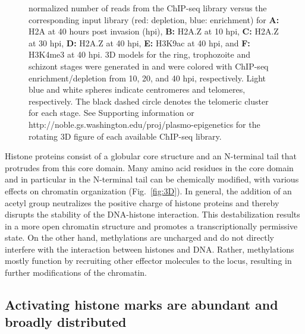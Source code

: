 \begin{figure}
{normalized number of reads from the ChIP-seq library versus the corresponding
input library (red: depletion, blue: enrichment) for \textbf{A:} H2A at
40 hours post invasion (hpi), \textbf{B:} H2A.Z at 10 hpi, \textbf{C:} H2A.Z
at 30 hpi, \textbf{D:} H2A.Z
at 40 hpi, \textbf{E:} H3K9ac at 40 hpi, and \textbf{F:} H3K4me3 at 40 hpi. 3D
models for the ring, trophozoite and schizont stages were generated in
\citet{ay:three-dimensional} and were colored with ChIP-seq enrichment/depletion
from 10, 20, and 40 hpi, respectively. Light blue and white spheres indicate
centromeres and telomeres, respectively. The black dashed circle
denotes the telomeric cluster for each stage. See Supporting information or
http://noble.gs.washington.edu/proj/plasmo-epigenetics for the
rotating 3D figure of each available ChIP-seq library.
}
\end{figure}

Histone proteins consist of a globular core structure and an N-terminal tail
that protrudes from this core domain. Many amino acid residues in the core
domain and in particular in the N-terminal tail can be chemically modified,
with various effects on chromatin organization (Fig.~\ref{fig:3D}). In general, the
addition of an acetyl group neutralizes the positive charge of histone
proteins and thereby disrupts the stability of the DNA-histone interaction.
This destabilization results in a more open chromatin structure and promotes a
transcriptionally permissive state. On the other hand, methylations are
uncharged and do not directly interfere with the interaction between histones
and DNA. Rather, methylations mostly function by recruiting other effector
molecules to the locus, resulting in further modifications of the chromatin.

\subsection{Activating histone marks are abundant and broadly distributed}

